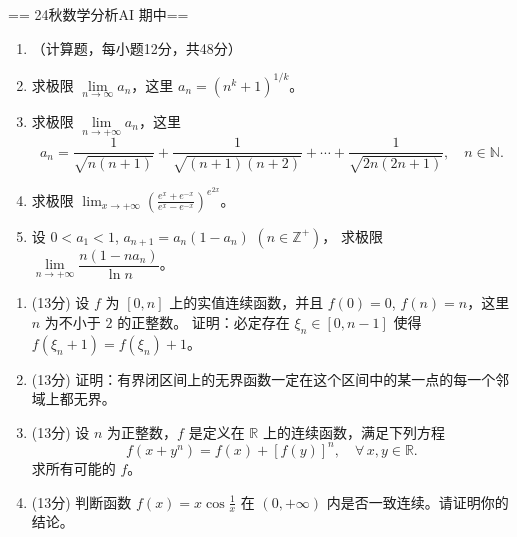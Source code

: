 == 24秋数学分析AI 期中==
\begin{enumerate}
\item[一]{（计算题，每小题12分，共48分）}
\item 求极限 $\lim\limits_{n\rightarrow\infty}a_{n}$，这里 $a_{n}=(n^k+1)^{1/k}$。

\item 求极限 $\lim\limits_{n\rightarrow+\infty} a_{n}$，这里
$$a_n=\frac{1}{\sqrt{n(n+1)}}+\frac{1}{\sqrt{(n+1)(n+2)}}+\cdots+\frac{1}{\sqrt{2n(2n+1)}},\quad n\in \mathbb{N}.$$

\item 求极限 $\displaystyle\lim_{x\rightarrow+\infty}\left(\frac{e^x+e^{-x}}{e^x-e^{-x}}\right)^{e^{2x}}$。

\item 设 $0<a_{1}<1$, $a_{n+1}=a_{n}(1-a_{n})$ $(n\in \mathbb{Z}^{+})$，
求极限 $\lim\limits_{n\rightarrow+\infty}\dfrac{n(1-n a_{n})}{\ln n}$。
\end{enumerate}

\begin{enumerate}
\item[二] (13分)
设 $f$ 为 $[0, n]$ 上的实值连续函数，并且 $f(0)=0$, $f(n)=n$，这里 $n$ 为不小于 $2$ 的正整数。
证明：必定存在 $\xi_n\in[0, n-1]$ 使得 $f(\xi_n+1)=f(\xi_n)+1$。

\item[三] (13分)
证明：有界闭区间上的无界函数一定在这个区间中的某一点的每一个邻域上都无界。

\item[四] (13分)
设 $n$ 为正整数，$f$ 是定义在 $\mathbb{R}$ 上的连续函数，满足下列方程
$$f(x+y^n)=f(x)+[f(y)]^n,\quad\forall\, x, y\in \mathbb{R}.$$
求所有可能的 $f$。

\item[五] (13分)
判断函数 $f(x)=x\cos\frac{1}{x}$ 在 $(0,+\infty)$ 内是否一致连续。请证明你的结论。
\end{enumerate}

